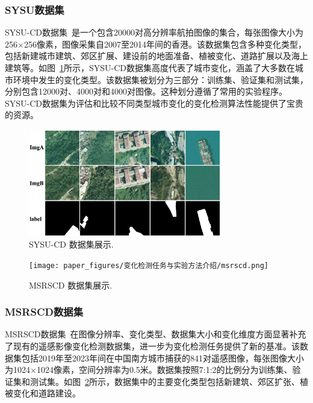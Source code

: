 \subsubsection{SYSU数据集}
SYSU-CD数据集~\cite{shi_deeply_2022}是一个包含20000对高分辨率航拍图像的集合，每张图像大小为256×256像素，图像采集自2007至2014年间的香港。该数据集包含多种变化类型，包括新建城市建筑、郊区扩展、建设前的地面准备、植被变化、道路扩展以及海上建筑等。如图~\ref{fig:sysu}所示，SYSU-CD数据集高度代表了城市变化，涵盖了大多数在城市环境中发生的变化类型。该数据集被划分为三部分：训练集、验证集和测试集，分别包含12000对、4000对和4000对图像。这种划分遵循了常用的实验程序。SYSU-CD数据集为评估和比较不同类型城市变化的变化检测算法性能提供了宝贵的资源。

\begin{figure}[!htbp]
  \centering
  \includegraphics[width=0.75\textwidth]{paper_figures/变化检测任务与实验方法介绍/sysu.png}
  \caption{SYSU-CD 数据集展示.}
  \label{fig:sysu}
\end{figure}

\begin{figure}[!htbp]
  \centering
  \texttt{[image: paper\_figures/变化检测任务与实验方法介绍/msrscd.png]}
  \caption{MSRSCD 数据集展示.}
  \label{fig:msrscd}
\end{figure}


\subsubsection{MSRSCD数据集}
MSRSCD数据集~\cite{Liu2025NetworkAD}在图像分辨率、变化类型、数据集大小和变化维度方面显著补充了现有的遥感影像变化检测数据集，进一步为变化检测任务提供了新的基准。该数据集包括2019年至2023年间在中国南方城市捕获的841对遥感图像，每张图像大小为1024×1024像素，空间分辨率为0.5米。数据集按照7:1:2的比例分为训练集、验证集和测试集。如图~\ref{fig:msrscd}所示，数据集中的主要变化类型包括新建筑、郊区扩张、植被变化和道路建设。

